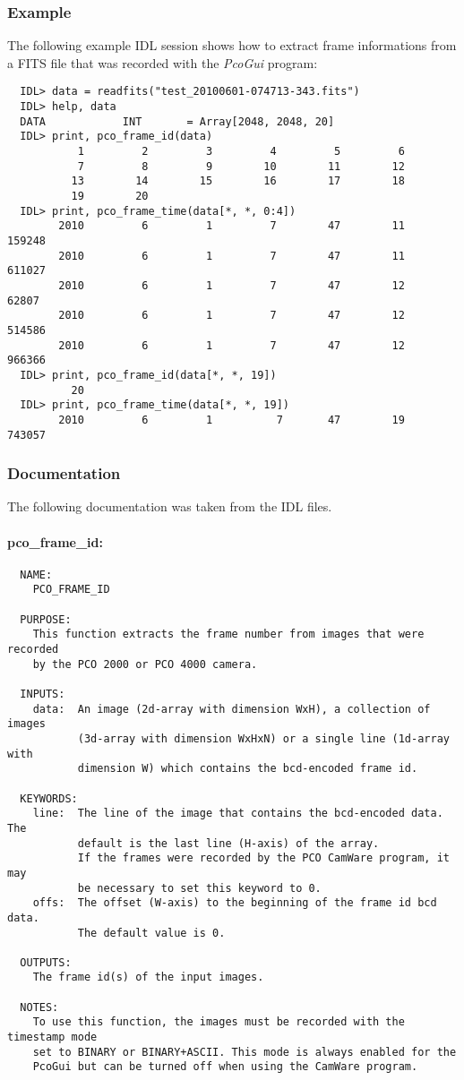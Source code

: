 \documentclass[11pt, a4paper]{scrartcl}
\begin{document}
\subsubsection{Example}
The following example IDL session shows how to extract frame informations from a FITS file that was recorded with the \emph{PcoGui} program:
\begin{verbatim}
  IDL> data = readfits("test_20100601-074713-343.fits")
  IDL> help, data
  DATA            INT       = Array[2048, 2048, 20]
  IDL> print, pco_frame_id(data)
           1         2         3         4         5         6
           7         8         9        10        11        12
          13        14        15        16        17        18
          19        20
  IDL> print, pco_frame_time(data[*, *, 0:4])
        2010         6         1         7        47        11     159248
        2010         6         1         7        47        11     611027
        2010         6         1         7        47        12      62807
        2010         6         1         7        47        12     514586
        2010         6         1         7        47        12     966366
  IDL> print, pco_frame_id(data[*, *, 19])  
          20
  IDL> print, pco_frame_time(data[*, *, 19])
        2010         6         1          7       47        19     743057
\end{verbatim}

\subsubsection{Documentation}
The following documentation was taken from the IDL files.

\paragraph{pco\_frame\_id:}
\begin{verbatim}
  NAME:
    PCO_FRAME_ID

  PURPOSE:
    This function extracts the frame number from images that were recorded
    by the PCO 2000 or PCO 4000 camera.

  INPUTS:
    data:  An image (2d-array with dimension WxH), a collection of images
           (3d-array with dimension WxHxN) or a single line (1d-array with
           dimension W) which contains the bcd-encoded frame id.

  KEYWORDS:
    line:  The line of the image that contains the bcd-encoded data. The
           default is the last line (H-axis) of the array.
           If the frames were recorded by the PCO CamWare program, it may
           be necessary to set this keyword to 0.
    offs:  The offset (W-axis) to the beginning of the frame id bcd data.
           The default value is 0.

  OUTPUTS:
    The frame id(s) of the input images.

  NOTES:
    To use this function, the images must be recorded with the timestamp mode
    set to BINARY or BINARY+ASCII. This mode is always enabled for the
    PcoGui but can be turned off when using the CamWare program.
\end{verbatim}
\end{document}
